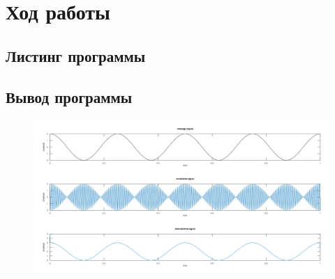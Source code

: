 \chapter{Ход работы}

\section{Листинг программы}


\section{Вывод программы}

\begin{figure}
	\centering
	\includegraphics[width=.9\textwidth]{images/1.png}
\end{figure}